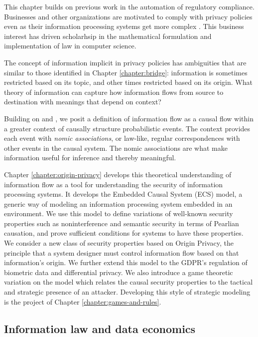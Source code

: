 \documentclass[../thesis.tex]{subfiles}
\begin{document}
 This chapter builds on previous work in the automation of
 regulatory compliance.
 Businesses and other organizations are motivated to comply
 with privacy policies even as their information
 processing systems get more complex \cite{barth2007privacy}
 \cite{deyoung2010experiences} \cite{sen2014bootstrapping}.
 This business interest has driven scholarhsip in the
 mathematical formulation and implementation of law
 in computer science.

 The concept of information implicit in privacy policies
 has ambiguities that are similar to those identified
 in Chapter \ref{chapter:bridge}: information is sometimes
 restricted based on its topic, and other times restricted
 based on its origin.
 What theory of information can capture how information
 flows from source to destination with meanings that depend
 on context?

 Building on \citet{dretske1981knowledge}
 and \citet{pearl2009causality}, we posit a definition
 of information flow as a causal flow within a greater
 context of causally structure probabilistic events.
 The context provides each event with
 \textit{nomic associations}, or law-like, regular
 correspondences with other events in the causal system.
 The nomic associations are what make information useful
 for inference and thereby meaningful.

 Chapter \ref{chapter:origin-privacy} develops this
 theoretical understanding of information flow as a
 tool for understanding the security of information processing
 systems.
 It develops the Embedded Causal System (ECS) model,
 a generic way of modeling an information processing system
 embedded in an environment.
 We use this model to define variations of well-known
 security properties such as noninterference and semantic
 security in terms of Pearlian causation,
 and prove sufficient conditions for systems to have these
 properties.
 We consider a new class of security properties based on
 Origin Privacy, the principle that a system designer
 must control information flow based on that information's
 origin.
 We further extend this model to the GDPR's regulation of
 biometric data and differential privacy.
 We also introduce a game theoretic variation on the model
 which relates the causal security properties to the tactical
 and strategic presence of an attacker.
 Developing this style of strategic modeling is the
 project of Chapter \ref{chapter:games-and-rules}.

 \subsection{Information law and data economics}
\end{document}
